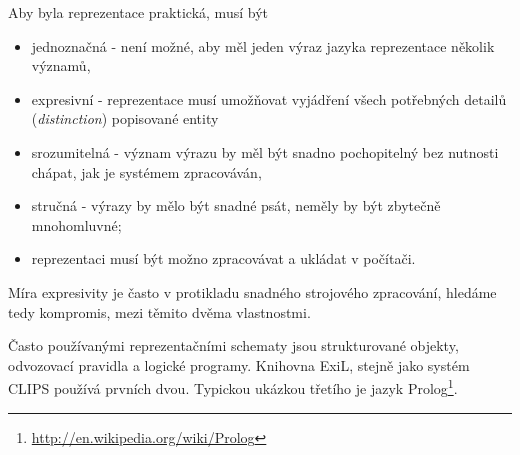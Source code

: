 Aby byla reprezentace praktická, musí být
\begin{itemize}
  \item jednoznačná - není možné, aby měl jeden výraz jazyka reprezentace
    několik významů,
  \item expresivní - reprezentace musí umožňovat vyjádření všech potřebných
    detailů (\emph{distinction}) popisované entity
  \item srozumitelná - význam výrazu by měl být snadno pochopitelný bez
    nutnosti chápat, jak je systémem zpracováván,
  \item stručná - výrazy by mělo být snadné psát, neměly by být zbytečně
    mnohomluvné;
  \item reprezentaci musí být možno zpracovávat a ukládat v počítači.
\end{itemize}
Míra expresivity je často v protikladu snadného strojového zpracování, hledáme
tedy kompromis, mezi těmito dvěma vlastnostmi.

Často používanými reprezentačními schematy jsou strukturované objekty,
odvozovací pravidla a logické programy. Knihovna ExiL, stejně jako systém CLIPS
používá prvních dvou. Typickou ukázkou třetího je jazyk
Prolog\footnote{\url{http://en.wikipedia.org/wiki/Prolog}}.

